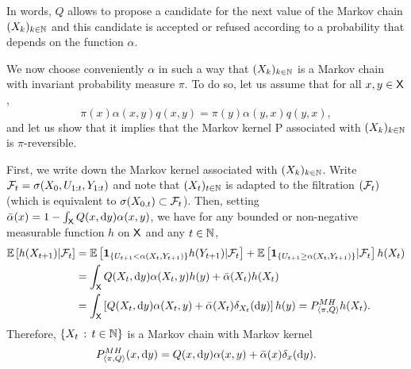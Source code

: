 \documentclass[english,graybox,envcountchap,envcountsame,sectrefs,shortlabels]{svmono}
\theoremstyle{style}
\begin{document}
 In words, $Q$ allows to propose a candidate for the next value of
the Markov chain $(X_{k})_{k\in\mathbb{N}}$ and this candidate is accepted or
refused according to a probability that depends on the function $\alpha$.

We now choose conveniently $\alpha$ in such a way that $(X_{k})_{k\in\mathbb{N}}$
is a Markov chain with invariant probability measure $\pi$. To do so, let us assume that
for all $x,y\in\mathsf{X}$,
\begin{equation}
\pi(x)\alpha(x,y)q(x,y)=\pi(y)\alpha(y,x)q(y,x),\label{eq:balance}
\end{equation}
and let us show that it implies that the Markov kernel P associated
with $(X_{k})_{k\in\mathbb{N}}$ is $\pi$-reversible.

First, we write down the Markov kernel associated with $(X_{k})_{k\in\mathbb{N}}$. Write $\mathcal{F}_{t}=\sigma(X_{0},U_{1:t},Y_{1:t})$
and note that $(X_{t})_{t\in\mathbb{N}}$ is adapted to the filtration $(\mathcal{F}_{t})$
(which is equivalent to $\sigma(X_{0,t})\subset\mathcal{F}_{t}$). Then,
setting $\bar{\alpha}(x)=1-\int_{\mathsf{X}}Q(x,\mathrm{d} y)\alpha(x,y)$, we
have for any bounded or non-negative measurable function $h$ on $\mathsf{X}$
and any $t\in\mathbb{N}$,
\begin{align*}
\mathbb{E}\left[h(X_{t+1})|\mathcal{F}_{t}\right] & =\mathbb{E}\left[\mathbf{1}_{\left\{ U_{t+1}<\alpha(X_{t},Y_{t+1})\right\} }h(Y_{t+1})|\mathcal{F}_{t}\right]+\mathbb{E}\left[\mathbf{1}_{\left\{ U_{t+1}\geq\alpha(X_{t},Y_{t+1})\right\} }|\mathcal{F}_{t}\right]h(X_{t})\\
 & =\int_{\mathsf{X}}Q(X_{t},\mathrm{d} y)\alpha(X_{t},y)h(y)+\bar{\alpha}(X_{t})h(X_{t})\\
 & =\int_{\mathsf{X}}\left[Q(X_{t},\mathrm{d} y)\alpha(X_{t},y)+\bar{\alpha}(X_{t})\delta_{X_{t}}(\mathrm{d} y)\right]h(y)=P_{\langle\pi,Q\rangle}^{MH}h(X_{t}).
\end{align*}
Therefore, $\left\{ X_{t}\,:\,t\in\mathbb{N}\right\}$ is a Markov chain with Markov
kernel
\begin{equation}
P_{\langle\pi,Q\rangle}^{MH}(x,\mathrm{d} y)=Q(x,\mathrm{d} y)\alpha(x,y)+\bar{\alpha}(x)\delta_{x}(\mathrm{d} y).\label{eq:def:mh}
\end{equation}
 
\end{document}
